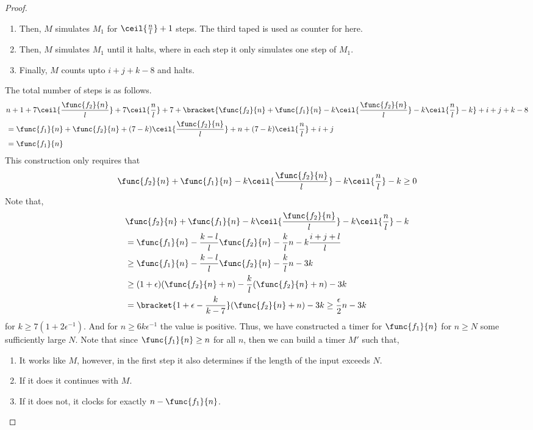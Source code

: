 \begin{proof}
\begin{enumerate}
        \item  Then, \(M\) simulates \(M_1\) for \(\ceil{\frac{n}{l}}+1\) steps. The third taped is used as counter for here.
        \item Then, \(M\) simulates \(M_1\) until it halts, where in each step it only simulates one step of \(M_1\).
        \item Finally, \(M\) counts upto \(i+j+k-8\) and halts. 
    \end{enumerate}
    The total number of steps is as follows.
    \begin{align*}
        &n+1 + 7\ceil{\frac{\func{f_2}{n}}{l}} + 7\ceil{\frac{n}{l}}+ 7 + \bracket{\func{f_2}{n} + \func{f_1}{n} - k\ceil{\frac{\func{f_2}{n}}{l}} - k\ceil{\frac{n}{l}} - k} + i+j+k-8 \\
        &= \func{f_1}{n} + \func{f_2}{n} + (7-k)\ceil{\frac{\func{f_2}{n}}{l}} + n + (7-k)\ceil{\frac{n}{l}} + i + j\\
        &= \func{f_1}{n} 
    \end{align*}
    This construction only requires that 
    \begin{equation*}
        \func{f_2}{n} + \func{f_1}{n} - k\ceil{\frac{\func{f_2}{n}}{l}} - k\ceil{\frac{n}{l}} - k \geq 0 
    \end{equation*}
    Note that, 
    \begin{align*}
        &\func{f_2}{n} + \func{f_1}{n} - k\ceil{\frac{\func{f_2}{n}}{l}} - k\ceil{\frac{n}{l}} - k\\
        &= \func{f_1}{n} - \dfrac{k-l}{l}\func{f_2}{n} - \dfrac{k}{l}n - k\dfrac{i+j+l}{l}\\
        &\geq \func{f_1}{n} - \dfrac{k-l}{l}\func{f_2}{n} - \dfrac{k}{l}n - 3k \\
        &\geq (1+\epsilon)(\func{f_2}{n} + n) - \dfrac{k}{l} (\func{f_2}{n} + n) - 3k\\
        &= \bracket{1+\epsilon - \dfrac{k}{k-7}}(\func{f_2}{n} + n) -3k \geq \dfrac{\epsilon}{2}n - 3k
    \end{align*}
    for \(k \geq 7(1+ 2\epsilon^{-1})\). And for \(n\geq 6k\epsilon^{-1}\) the value is positive. Thus, we have constructed a timer for \(\func{f_1}{n}\) for \(n\geq N\) some sufficiently large \(N\). Note that since \(\func{f_1}{n} \geq n\) for all \(n\), then we can build a timer \(M'\) such that,
    \begin{enumerate}
        \item It works like \(M\), however, in the first step it also determines if the length of the input exceeds \(N\). 
        \item If it does it continues with \(M\).
        \item If it does not, it clocks for exactly \(n - \func{f_1}{n}\).
    \end{enumerate} 
\end{proof}

